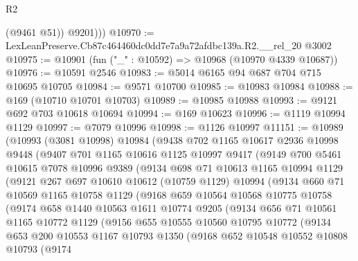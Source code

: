 \begin{lexlean}{R2}
\begin{coremodule}
            (@9461 @51))
          @9201)))
@10970 := LexLeanPreserve.Cb87c464460dc0dd7e7a9a72afdbc139a.R2.__rel_20 @3002
@10975 := @10901 (fun ("_" : @10592) => @10968 (@10970 @4339 @10687))
@10976 := @10591 @2546
@10983 := @5014 @6165 @94 @687 @704 @715 @10695 @10705
@10984 := @9571 @10700
@10985 := @10983 @10984
@10988 := @169 (@10710 @10701 @10703)
@10989 := @10985 @10988
@10993 := @9121 @692 @703 @10618 @10694
@10994 := @169 @10623
@10996 := @1119 @10994 @1129
@10997 := @7079 @10996
@10998 := @1126 @10997
@11151 := @10989
    (@10993
      (@3081 @10998)
      @10984
      (@9438
        @702
        @1165
        @10617
        @2936
        @10998
        @9448
        (@9407
          @701
          @1165
          @10616
          @1125
          @10997
          @9417
          (@9149
            @700
            @5461
            @10615
            @7078
            @10996
            @9389
            (@9134
              @698
              @71
              @10613
              @1165
              @10994
              @1129
              (@9121
                @267
                @697
                @10610
                @10612
                (@10759 @1129)
                @10994
                (@9134
                  @660
                  @71
                  @10569
                  @1165
                  @10758
                  @1129
                  (@9168
                    @659
                    @10564
                    @10568
                    @10775
                    @10758
                    (@9174
                      @658
                      @1440
                      @10563
                      @1611
                      @10774
                      @9205
                      (@9134
                        @656
                        @71
                        @10561
                        @1165
                        @10772
                        @1129
                        (@9156
                          @655
                          @10555
                          @10560
                          @10795
                          @10772
                          (@9134
                            @653
                            @200
                            @10553
                            @1167
                            @10793
                            @1350
                            (@9168
                              @652
                              @10548
                              @10552
                              @10808
                              @10793
                              (@9174

\end{coremodule}
\end{lexlean}
